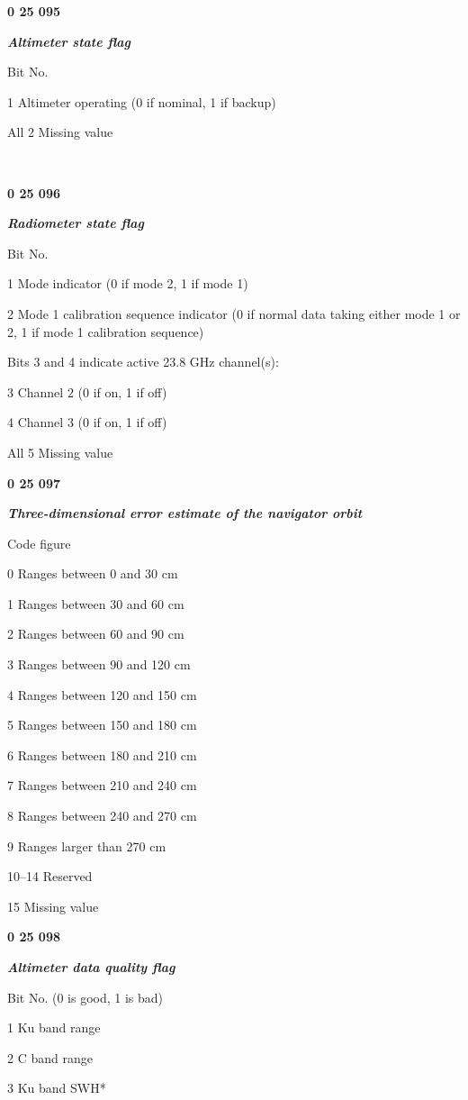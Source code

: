 \textbf{0 25 095}

\emph{\textbf{Altimeter state flag}}

Bit No.

1 Altimeter operating (0 if nominal, 1 if backup)

All 2 Missing value

\textbf{\\
}

\textbf{0 25 096}

\emph{\textbf{Radiometer state flag}}

Bit No.

1 Mode indicator (0 if mode 2, 1 if mode 1)

2 Mode 1 calibration sequence indicator (0 if normal data taking either mode 1 or 2, 1 if mode 1 calibration sequence)

Bits 3 and 4 indicate active 23.8 GHz channel(s):

3 Channel 2 (0 if on, 1 if off)

4 Channel 3 (0 if on, 1 if off)

All 5 Missing value

\textbf{0 25 097}

\emph{\textbf{Three-dimensional error estimate of the navigator orbit}}

Code figure

0 Ranges between 0 and 30 cm

1 Ranges between 30 and 60 cm

2 Ranges between 60 and 90 cm

3 Ranges between 90 and 120 cm

4 Ranges between 120 and 150 cm

5 Ranges between 150 and 180 cm

6 Ranges between 180 and 210 cm

7 Ranges between 210 and 240 cm

8 Ranges between 240 and 270 cm

9 Ranges larger than 270 cm

10--14 Reserved

15 Missing value

\textbf{0 25 098}

\emph{\textbf{Altimeter data quality flag}}

Bit No. (0 is good, 1 is bad)

1 Ku band range

2 C band range

3 Ku band SWH*

